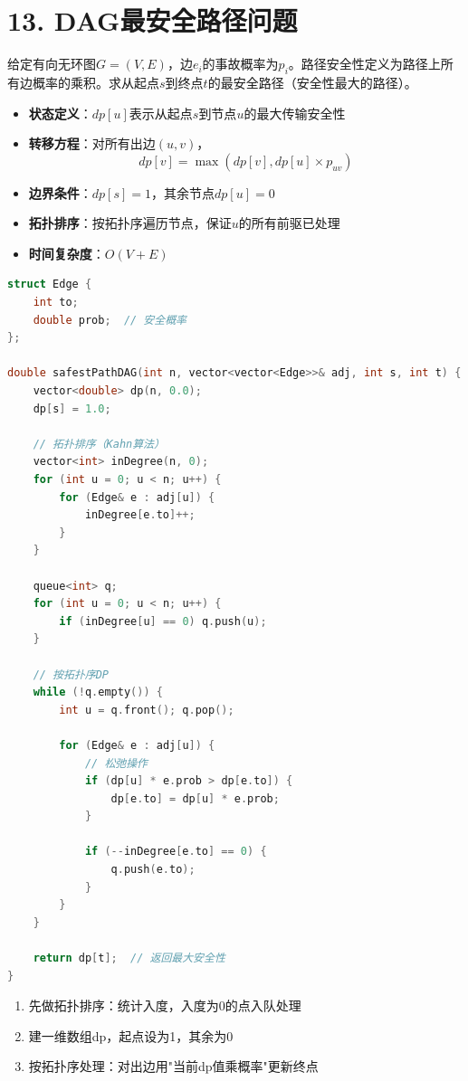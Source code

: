 \section*{13. DAG最安全路径问题}

给定有向无环图$G=(V,E)$，边$e_i$的事故概率为$p_i$。路径安全性定义为路径上所有边概率的乘积。求从起点$s$到终点$t$的最安全路径（安全性最大的路径）。



\begin{itemize}
    \item \textbf{状态定义}：$dp[u]$表示从起点$s$到节点$u$的最大传输安全性
    \item \textbf{转移方程}：对所有出边$(u, v)$，$$dp[v] = \max(dp[v], dp[u] \times p_{uv})$$
    \item \textbf{边界条件}：$dp[s] = 1$，其余节点$dp[u] = 0$
    \item \textbf{拓扑排序}：按拓扑序遍历节点，保证$u$的所有前驱已处理
    \item \textbf{时间复杂度}：$O(V+E)$
\end{itemize}
\begin{lstlisting}[language=C++, style=cppstyle]
struct Edge {
    int to;
    double prob;  // 安全概率
};

double safestPathDAG(int n, vector<vector<Edge>>& adj, int s, int t) {
    vector<double> dp(n, 0.0);
    dp[s] = 1.0;

    // 拓扑排序（Kahn算法）
    vector<int> inDegree(n, 0);
    for (int u = 0; u < n; u++) {
        for (Edge& e : adj[u]) {
            inDegree[e.to]++;
        }
    }

    queue<int> q;
    for (int u = 0; u < n; u++) {
        if (inDegree[u] == 0) q.push(u);
    }

    // 按拓扑序DP
    while (!q.empty()) {
        int u = q.front(); q.pop();

        for (Edge& e : adj[u]) {
            // 松弛操作
            if (dp[u] * e.prob > dp[e.to]) {
                dp[e.to] = dp[u] * e.prob;
            }

            if (--inDegree[e.to] == 0) {
                q.push(e.to);
            }
        }
    }

    return dp[t];  // 返回最大安全性
}
\end{lstlisting}


\begin{enumerate}
    \item 先做拓扑排序：统计入度，入度为0的点入队处理
    \item 建一维数组dp，起点设为1，其余为0
    \item 按拓扑序处理：对出边用"当前dp值乘概率"更新终点
\end{enumerate}

